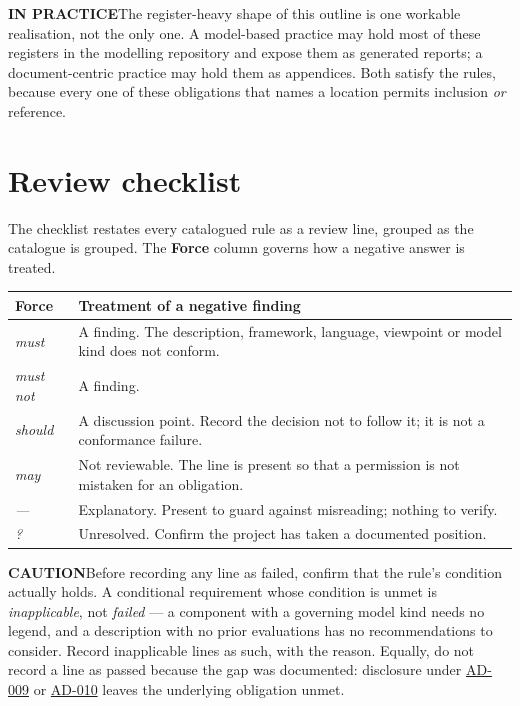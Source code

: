 \documentclass[11pt,a4paper]{report}
\newcommand{\calloutlead}[2]{{\sffamily\bfseries\footnotesize\color{#1}#2\quad}}
\newcommand{\tip}[1]{\begin{tipbox}\calloutlead{teal}{IN PRACTICE}#1\end{tipbox}}
\newcommand{\risknote}[1]{\begin{riskbox}\calloutlead{brick}{CAUTION}#1\end{riskbox}}
\newcommand{\rref}[1]{\hyperref[rule:#1]{\textsf{\small #1}}}
\begin{document}
\tip{The register-heavy shape of this outline is one workable realisation, not
the only one. A model-based practice may hold most of these registers in the
modelling repository and expose them as generated reports; a document-centric
practice may hold them as appendices. Both satisfy the rules, because every one
of these obligations that names a location permits inclusion \emph{or}
reference.}

\chapter{Review checklist}
\label{ch:checklist}

The checklist restates every catalogued rule as a review line, grouped as the
catalogue is grouped. The \textbf{Force} column governs how a negative answer is
treated.

\begin{center}
\small
\begin{tabular}{@{}l L{110mm}@{}}
\toprule
\textbf{Force} & \textbf{Treatment of a negative finding} \\
\midrule
\textit{must}     & A finding. The description, framework, language, viewpoint or model kind does not conform. \\
\textit{must not} & A finding. \\
\textit{should}   & A discussion point. Record the decision not to follow it; it is not a conformance failure. \\
\textit{may}      & Not reviewable. The line is present so that a permission is not mistaken for an obligation. \\
\textit{---}      & Explanatory. Present to guard against misreading; nothing to verify. \\
\textit{?}        & Unresolved. Confirm the project has taken a documented position. \\
\bottomrule
\end{tabular}
\end{center}

\risknote{Before recording any line as failed, confirm that the rule's condition
actually holds. A conditional requirement whose condition is unmet is
\emph{inapplicable}, not \emph{failed} --- a component with a governing model
kind needs no legend, and a description with no prior evaluations has no
recommendations to consider. Record inapplicable lines as such, with the reason.
Equally, do not record a line as passed because the gap was documented:
disclosure under \rref{AD-009} or
\rref{AD-010} leaves the underlying obligation unmet.}
\end{document}

